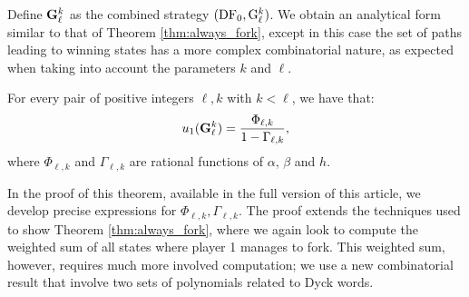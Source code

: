\documentclass[a4paper,english,cleveref, autoref,numberwithinsect]{lipics-v2019}
\newcommand{\df}{\text{\rm DF}}
\newcommand{\gup}{{\rm {G}}}
\newcommand{\bgup}{{\rm {\bf G}}}
\begin{document}
Define $\bgup_\ell^k$ as the combined strategy $(\df_0, \gup_\ell^k)$. We obtain an analytical form similar to that of Theorem \ref{thm:always_fork}, except in 
this case the set of paths leading to winning states has a more complex combinatorial nature, as expected when taking into account the 
parameters $k$ and $\ell$.
\begin{theorem}\label{thm-dificil}
For every pair of positive integers $\ell, k$ with $k< \ell$, we have that:
$$u_1(\bgup^k_\ell) = \frac{\Phi_{\ell,k}}{1-\Gamma_{\ell,k}},$$
where $\Phi_{\ell,k}$ and $\Gamma_{\ell,k}$ are rational functions of $\alpha$, $\beta$ and $h$.%
\end{theorem}
In the proof of this theorem, available in the full version of this article, we develop precise expressions for $\Phi_{\ell, k},\Gamma_{\ell,k}$.  %
The proof extends the techniques used to show Theorem \ref{thm:always_fork}, where we again look to compute the 
weighted sum of all states where player 1 manages to fork. This weighted sum, however, requires much more involved computation; 
we use a new combinatorial result that involve two sets
of polynomials related to Dyck words. 
\end{document}

